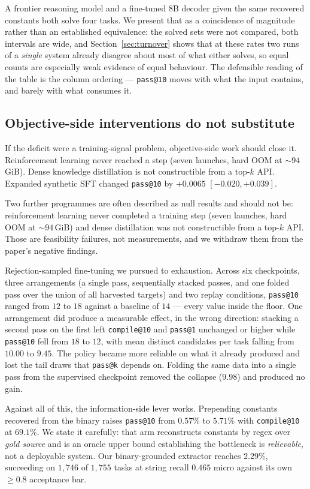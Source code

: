 \documentclass[conference]{IEEEtran}
\makeatletter
\newcommand{\passatk}{\texttt{pass@k}\xspace}
\newcommand{\passat}[1]{\texttt{pass@#1}\xspace}
\newcommand{\compileat}[1]{\texttt{compile@#1}\xspace}
\makeatother
\begin{document}
A frontier reasoning model and a fine-tuned 8B decoder given the same recovered
constants both solve four tasks. We present that as a coincidence of magnitude
rather than an established equivalence: the solved sets were not compared, both
intervals are wide, and Section~\ref{sec:turnover} shows that at these rates two
runs of a \emph{single} system already disagree about most of what either solves,
so equal counts are especially weak evidence of equal behaviour. The defensible reading of the table is the column
ordering --- \passat{10} moves with what the input contains, and barely with what
consumes it.

\subsection{Objective-side interventions do not substitute}
If the deficit were a training-signal problem, objective-side work should close
it. Reinforcement learning never reached a step (seven launches, hard OOM at
${\sim}94$\,GiB). Dense knowledge distillation is not constructible from a
top-$k$ API. Expanded synthetic SFT changed \passat{10} by $+0.0065$
$[-0.020,+0.039]$.

Two further programmes are often described as null results and should not be:
reinforcement learning never completed a training step (seven launches, hard OOM
at ${\sim}94$\,GiB) and dense distillation was not constructible from a top-$k$
API. Those are feasibility failures, not measurements, and we withdraw them from
the paper's negative findings.

Rejection-sampled fine-tuning we pursued to exhaustion. Across six checkpoints,
three arrangements (a single pass, sequentially stacked passes, and one folded
pass over the union of all harvested targets) and two replay conditions,
\passat{10} ranged from $12$ to $18$ against a baseline of $14$ --- every value
inside the floor. One arrangement did produce a measurable effect, in the wrong
direction: stacking a second pass on the first left \compileat{10} and
\passat{1} unchanged or higher while \passat{10} fell from $18$ to $12$, with
mean distinct candidates per task falling from $10.00$ to $9.45$. The policy
became more reliable on what it already produced and lost the tail draws that
\passatk depends on. Folding the same data into a single pass from the
supervised checkpoint removed the collapse ($9.98$) and produced no gain.

Against all of this, the information-side lever works. Prepending constants
recovered from the binary raises \passat{10} from $0.57\%$ to $5.71\%$ with
\compileat{10} at $69.1\%$. We state it carefully: that arm reconstructs
constants by regex over \emph{gold source} and is an oracle upper bound
establishing the bottleneck is \emph{relievable}, not a deployable system. Our
binary-grounded extractor reaches $2.29\%$, succeeding on $1{,}746$ of $1{,}755$
tasks at string recall $0.465$ micro against its own $\geq0.8$ acceptance bar.
\end{document}
